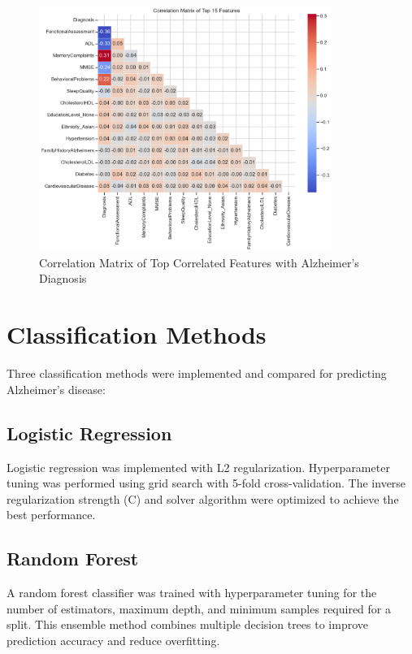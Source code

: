 \documentclass[12pt]{article}
\begin{document}
\begin{figure}[H]
    \centering
    \includegraphics[width=0.85\textwidth]{figures/correlation_heatmap.png}
    \caption{Correlation Matrix of Top Correlated Features with Alzheimer's Diagnosis}
    \label{fig:correlation}
\end{figure}

\section{Classification Methods}
\label{sec:methods}

Three classification methods were implemented and compared for predicting Alzheimer's disease:

\subsection{Logistic Regression}
Logistic regression was implemented with L2 regularization. Hyperparameter tuning was performed using grid search with 5-fold cross-validation. The inverse regularization strength (C) and solver algorithm were optimized to achieve the best performance.

\subsection{Random Forest}
A random forest classifier was trained with hyperparameter tuning for the number of estimators, maximum depth, and minimum samples required for a split. This ensemble method combines multiple decision trees to improve prediction accuracy and reduce overfitting.
\end{document}
